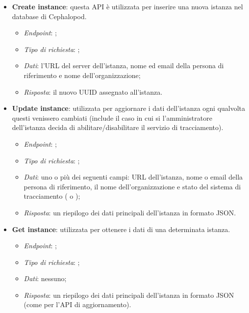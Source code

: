             \begin{itemize}
                \item \textbf{Create instance}: questa \ac{API} è utilizzata per inserire una nuova istanza nel database di Cephalopod.
                    \begin{itemize}
                        \item \textit{Endpoint}: ;
                        \item \textit{Tipo di richiesta}: ;
                        \item \textit{Dati}: l'\ac{URL} del server dell'istanza, nome ed email della persona di riferimento e nome dell'organizzazione;
                        \item \textit{Risposta}: il nuovo \ac{UUID} assegnato all'istanza.
                    \end{itemize}
                \item \textbf{Update instance}: utilizzata per aggiornare i dati dell'istanza ogni qualvolta questi venissero cambiati (include il caso in cui si l'amministratore dell'istanza decida di abilitare/disabilitare il servizio di tracciamento).
                    \begin{itemize}
                        \item \textit{Endpoint}: ;
                        \item \textit{Tipo di richiesta}: ;
                        \item \textit{Dati}: uno o più dei seguenti campi: \ac{URL} dell'istanza, nome o email della persona di riferimento, il nome dell'organizzazione e stato del sistema di tracciamento ( o );
                        \item \textit{Risposta}: un riepilogo dei dati principali dell'istanza in formato \ac{JSON}.
                    \end{itemize}
                \item \textbf{Get instance}: utilizzata per ottenere i dati di una determinata istanza.
                    \begin{itemize}
                        \item \textit{Endpoint}: ;
                        \item \textit{Tipo di richiesta}: ;
                        \item \textit{Dati}: nessuno;
                        \item \textit{Risposta}: un riepilogo dei dati principali dell'istanza in formato \ac{JSON} (come per l'\ac{API} di aggiornamento).
                    \end{itemize}
            \end{itemize}
            
